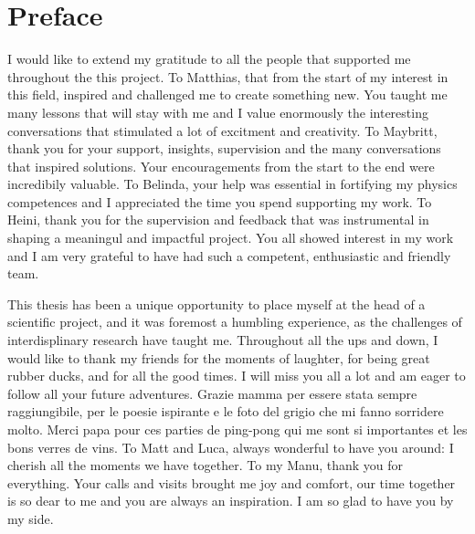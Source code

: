 \chapter*{Preface}

I would like to extend my gratitude to all the people that supported me throughout the this project. To Matthias, that from the start of my interest in this field, inspired and challenged me to create something new. You taught me many lessons that will stay with me and I value enormously the interesting conversations that stimulated a lot of excitment and creativity. To Maybritt, thank you for your support, insights, supervision and the many conversations that inspired solutions. Your encouragements from the start to the end were incredibily valuable. To Belinda, your help was essential in fortifying my physics competences and I appreciated the time you spend supporting my work. To Heini, thank you for the supervision and feedback that was instrumental in shaping a meaningul and impactful project. You all showed interest in my work and I am very grateful to have had such a competent, enthusiastic and friendly team.

This thesis has been a unique opportunity to place myself at the head of a scientific project, and it was foremost a humbling experience, as the challenges of interdisplinary research have taught me. Throughout all the ups and down, I would like to thank my friends for the moments of laughter, for being great rubber ducks, and for all the good times. I will miss you all a lot and am eager to follow all your future adventures. Grazie mamma per essere stata sempre raggiungibile, per le poesie ispirante e le foto del grigio che mi fanno sorridere molto. Merci papa pour ces parties de ping-pong qui me sont si importantes et les bons verres de vins. To Matt and Luca, always wonderful to have you around: I cherish all the moments we have together. To my Manu, thank you for everything. Your calls and visits brought me joy and comfort, our time together is so dear to me and you are always an inspiration. I am so glad to have you by my side. 


